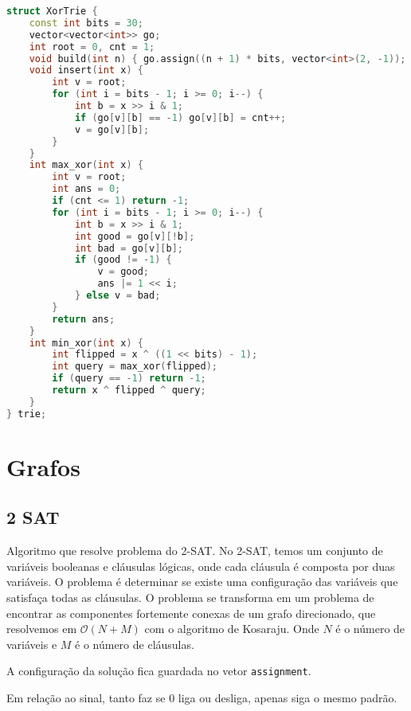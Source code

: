 \documentclass[10pt, a4paper, oneside]{book}
\begin{document}
\begin{lstlisting}[language=C++]
struct XorTrie {
    const int bits = 30;
    vector<vector<int>> go;
    int root = 0, cnt = 1;
    void build(int n) { go.assign((n + 1) * bits, vector<int>(2, -1)); }
    void insert(int x) {
        int v = root;
        for (int i = bits - 1; i >= 0; i--) {
            int b = x >> i & 1;
            if (go[v][b] == -1) go[v][b] = cnt++;
            v = go[v][b];
        }
    }
    int max_xor(int x) {
        int v = root;
        int ans = 0;
        if (cnt <= 1) return -1;
        for (int i = bits - 1; i >= 0; i--) {
            int b = x >> i & 1;
            int good = go[v][!b];
            int bad = go[v][b];
            if (good != -1) {
                v = good;
                ans |= 1 << i;
            } else v = bad;
        }
        return ans;
    }
    int min_xor(int x) {
        int flipped = x ^ ((1 << bits) - 1);
        int query = max_xor(flipped);
        if (query == -1) return -1;
        return x ^ flipped ^ query;
    }
} trie;
\end{lstlisting}
\hfill

\newpage

%
%
%
%

\chapter{Grafos}

\section{2 SAT}


Algoritmo que resolve problema do 2-SAT. No 2-SAT, temos um conjunto de variáveis booleanas e cláusulas lógicas, onde cada cláusula é composta por duas variáveis. O problema é determinar se existe uma configuração das variáveis que satisfaça todas as cláusulas. O problema se transforma em um problema de encontrar as componentes fortemente conexas de um grafo direcionado, que resolvemos em $\mathcal{O}(N + M)$ com o algoritmo de Kosaraju. Onde $N$ é o número de variáveis e $M$ é o número de cláusulas.  



A configuração da solução fica guardada no vetor \texttt{assignment}.



Em relação ao sinal, tanto faz se 0 liga ou desliga, apenas siga o mesmo padrão.

\hfill
\end{document}
